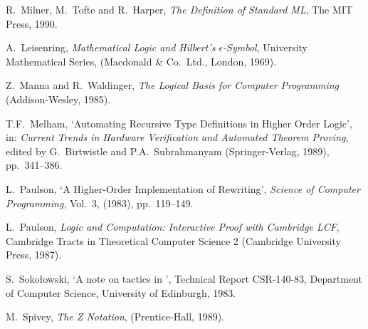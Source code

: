 \begin{thebibliography}{99}
R.\ Milner, M.\ Tofte and R.\ Harper,
{\it The Definition of Standard ML\/},
The MIT Press, 1990.

A.\ Leisenring,
{\it Mathematical Logic and Hilbert's $\epsilon$-Symbol\/},
{\rm University Mathematical Series},
(Macdonald \& Co.\ Ltd., London, 1969).

Z.\ Manna and R.\ Waldinger,
{\it The Logical Basis for Computer Programming\/}
(Addison-Wesley, 1985).

T.F.\ Melham, `Automating Recursive Type Definitions
in Higher Order Logic',
in: {\it Current Trends in Hardware Verification and
Automated Theorem Proving\/}, edited by G.\ Birtwistle
and P.A.\ Subrahmanyam
(Springer-Verlag, 1989), pp.\ 341--386.

L.\ Paulson,
`A Higher-Order Implementation of Rewriting',
{\it Science of Computer Programming}, Vol.\ 3, (1983), pp.\ 119--149.

 L.\ Paulson,
{\it Logic and Computation: Interactive Proof with Cambridge LCF},
Cambridge Tracts in Theoretical Computer Science 2
(Cambridge University Press, 1987).

%
S.\ Soko\l owski, `A note on tactics in \LCF',
Technical Report CSR-140-83, Department of Computer Science,
University of Edinburgh, 1983.


M.\ Spivey,
{\it The Z Notation}, (Prentice-Hall, 1989).

\end{thebibliography}



